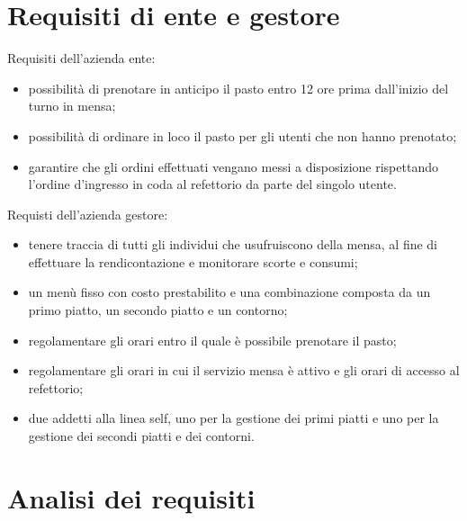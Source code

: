 \documentclass[a4paper, titlepage, 12pt, openright, twoside]{book}
\begin{document}
\section{Requisiti di ente e gestore}

Requisiti dell'azienda ente:
\begin{itemize}
	\item possibilità di prenotare in anticipo il pasto entro 12 ore prima dall'inizio del turno in mensa;
	\item possibilità di ordinare in loco il pasto per gli utenti che non hanno prenotato;
	\item garantire che gli ordini effettuati vengano messi a disposizione rispettando l'ordine d'ingresso in coda al refettorio da parte del singolo utente.
\end{itemize}

Requisti dell'azienda gestore:
\begin{itemize}
	\item tenere traccia di tutti gli individui che usufruiscono della mensa, al fine di effettuare la rendicontazione e monitorare scorte e consumi;
	\item un menù fisso con costo prestabilito e una combinazione composta da un primo piatto, un secondo piatto e un contorno;
	\item regolamentare gli orari entro il quale è possibile prenotare il pasto;
	\item regolamentare gli orari in cui il servizio mensa è attivo e gli orari di accesso al refettorio;
	\item due addetti alla linea self, uno per la gestione dei primi piatti e uno per la gestione dei secondi piatti e dei contorni.
\end{itemize}

\section{Analisi dei requisiti}
\end{document}
